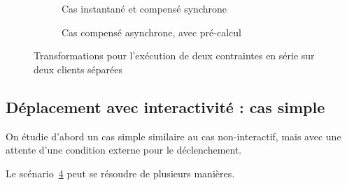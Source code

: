 \documentclass{article}
\begin{document}
\begin{figure}[h]
\centering
\begin{subfigure}{.5\linewidth}
\begin{tikzpicture}

\end{tikzpicture}
\caption{Cas instantané et compensé synchrone}
\label{depl.simple.async.instant}
\end{subfigure}

\begin{subfigure}{.5\linewidth}
    \begin{tikzpicture}
    
    \end{tikzpicture}
    \caption{Cas compensé asynchrone, avec pré-calcul}
    \label{depl.simple.sync.comp}
\end{subfigure}
\caption{Transformations pour l'exécution de deux contraintes en série sur deux clients séparées}
\label{scenar.deplacement}
\end{figure}





\subsection{Déplacement avec interactivité : cas simple}
On étudie d'abord un cas simple similaire au cas non-interactif, mais avec une attente d'une condition externe pour le déclenchement.

\begin{figure}[h]
	\centering
	\begin{tikzpicture}
	
	\end{tikzpicture}
	\label{scenar.trigger-1}
\end{figure}

Le scénario~\ref{scenar.trigger-1} peut se résoudre de plusieurs manières.
\end{document}
